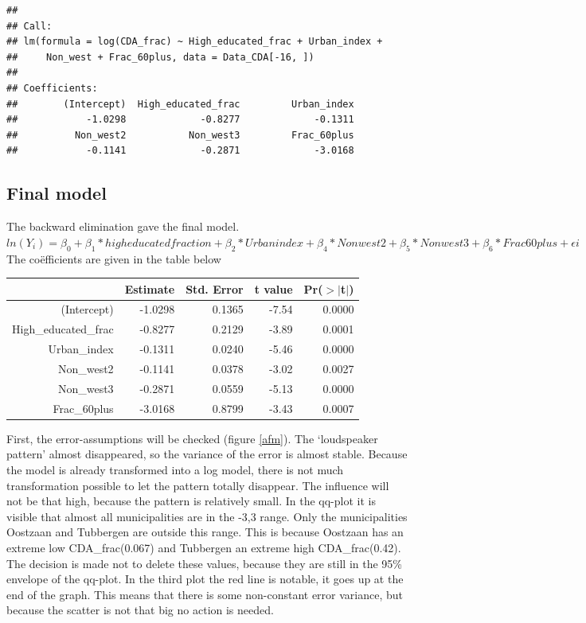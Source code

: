 \documentclass[11pt,]{article}
\begin{document}
\begin{verbatim}
## 
## Call:
## lm(formula = log(CDA_frac) ~ High_educated_frac + Urban_index + 
##     Non_west + Frac_60plus, data = Data_CDA[-16, ])
## 
## Coefficients:
##        (Intercept)  High_educated_frac         Urban_index  
##            -1.0298             -0.8277             -0.1311  
##          Non_west2           Non_west3         Frac_60plus  
##            -0.1141             -0.2871             -3.0168
\end{verbatim}

\subsection{Final model}\label{final-model}

The backward elimination gave the final model.\\
\(ln(Y_i) = \beta_0 + \beta_1*high educated fraction + \beta_2*Urban index + \beta_4*Non west2 + \beta_5*Non west 3 + \beta_6*Frac 60plus + \epsilon i\)
The coëfficients are given in the table below

\begin{table}[ht]
\centering
\begin{tabular}{rrrrr}
  \hline
 & Estimate & Std. Error & t value & Pr($>$$|$t$|$) \\ 
  \hline
(Intercept) & -1.0298 & 0.1365 & -7.54 & 0.0000 \\ 
  High\_educated\_frac & -0.8277 & 0.2129 & -3.89 & 0.0001 \\ 
  Urban\_index & -0.1311 & 0.0240 & -5.46 & 0.0000 \\ 
  Non\_west2 & -0.1141 & 0.0378 & -3.02 & 0.0027 \\ 
  Non\_west3 & -0.2871 & 0.0559 & -5.13 & 0.0000 \\ 
  Frac\_60plus & -3.0168 & 0.8799 & -3.43 & 0.0007 \\ 
   \hline
\end{tabular}
\end{table}

First, the error-assumptions will be checked (figure \ref{afm}). The
`loudspeaker pattern' almost disappeared, so the variance of the error
is almost stable. Because the model is already transformed into a log
model, there is not much transformation possible to let the pattern
totally disappear. The influence will not be that high, because the
pattern is relatively small. In the qq-plot it is visible that almost
all municipalities are in the -3,3 range. Only the municipalities
Oostzaan and Tubbergen are outside this range. This is because Oostzaan
has an extreme low CDA\_frac(0.067) and Tubbergen an extreme high
CDA\_frac(0.42). The decision is made not to delete these values,
because they are still in the 95\% envelope of the qq-plot. In the third
plot the red line is notable, it goes up at the end of the graph. This
means that there is some non-constant error variance, but because the
scatter is not that big no action is needed.
\end{document}
